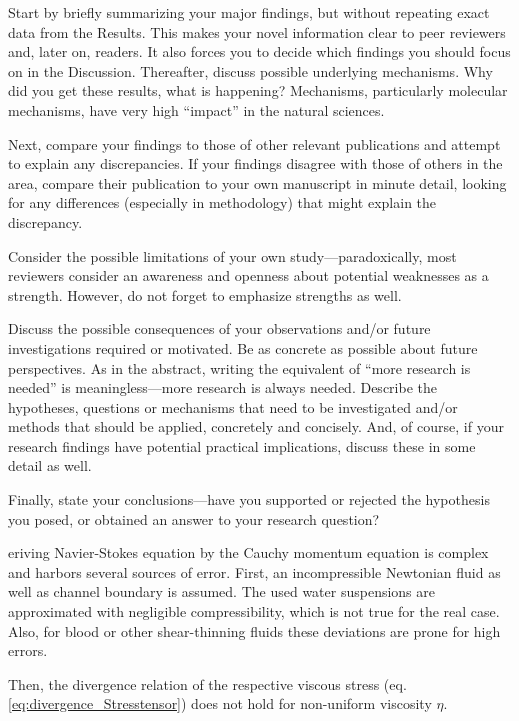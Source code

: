  

Start by briefly summarizing your major findings, but without repeating exact data from the Results. This makes your novel information clear to peer reviewers and, later on, readers. It also forces you to decide which findings you should focus on in the Discussion.
Thereafter, discuss possible underlying mechanisms. Why did you get these results, what is happening? Mechanisms, particularly molecular mechanisms, have very high “impact” in the natural sciences.

Next, compare your findings to those of other relevant publications and attempt to explain any discrepancies. If your findings disagree with those of others in the area, compare their publication to your own manuscript in minute detail, looking for any differences (especially in methodology) that might explain the discrepancy.

Consider the possible limitations of your own study—paradoxically, most reviewers consider an awareness and openness about potential weaknesses as a strength. However, do not forget to emphasize strengths as well.

Discuss the possible consequences of your observations and/or future investigations required or motivated. Be as concrete as possible about future perspectives. As in the abstract, writing the equivalent of “more research is needed” is meaningless—more research is always needed. Describe the hypotheses, questions or mechanisms that need to be investigated and/or methods that should be applied, concretely and concisely. And, of course, if your research findings have potential practical implications, discuss these in some detail as well.

Finally, state your conclusions—have you supported or rejected the hypothesis you posed, or obtained an answer to your research question?





eriving Navier-Stokes equation by the Cauchy momentum equation is complex and harbors several sources of error. First, an incompressible Newtonian fluid as well as channel boundary is assumed. The used water suspensions are approximated with negligible compressibility, which is not true for the real case. Also, for blood or other shear-thinning fluids these deviations are prone for high errors.  

Then, the divergence relation of the respective viscous stress (eq. \ref{eq:divergence_Stresstensor}) does not hold for non-uniform viscosity $\eta$.

